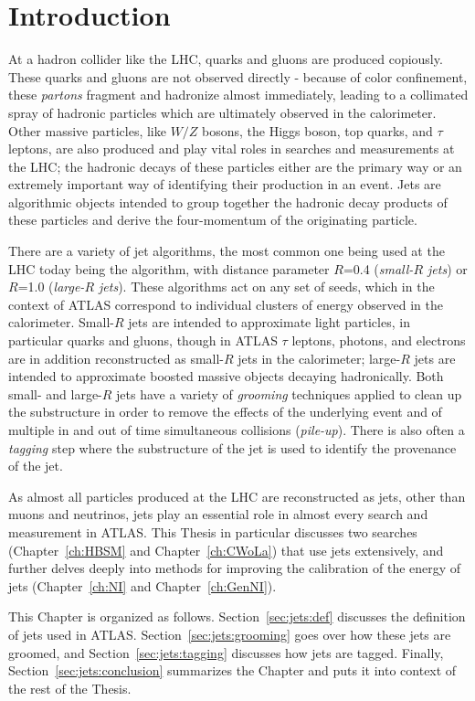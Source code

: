 \section{Introduction}
At a hadron collider like the LHC, quarks and gluons are produced copiously.
These quarks and gluons are not observed directly - because of color confinement, these \textit{partons} fragment and hadronize almost immediately, leading to a collimated spray of hadronic particles which are ultimately observed in the calorimeter.
Other massive particles, like $W/Z$ bosons, the Higgs boson, top quarks, and $\tau$ leptons, are also produced and play vital roles in searches and measurements at the LHC; the hadronic decays of these particles either are the primary way or an extremely important way of identifying their production in an event.
Jets are algorithmic objects intended to group together the hadronic decay products of these particles and derive the four-momentum of the originating particle.

There are a variety of jet algorithms, the most common one being used at the LHC today being the \antikt{} algorithm, with distance parameter $R$=0.4 (\textit{small-$R$ jets}) or $R$=1.0 (\textit{large-$R$ jets}).
These algorithms act on any set of seeds, which in the context of ATLAS correspond to individual clusters of energy observed in the calorimeter.
Small-$R$ jets are intended to approximate light particles, in particular quarks and gluons, though in ATLAS $\tau$ leptons, photons, and electrons are in addition reconstructed as small-$R$ jets in the calorimeter; large-$R$ jets are intended to approximate boosted massive objects decaying hadronically.
Both small- and large-$R$ jets have a variety of \textit{grooming} techniques applied to clean up the substructure in order to remove the effects of the underlying event and of multiple in and out of time simultaneous collisions (\textit{pile-up}).
There is also often a \textit{tagging} step where the substructure of the jet is used to identify the provenance of the jet.

As almost all particles produced at the LHC are reconstructed as jets, other than muons and neutrinos, jets play an essential role in almost every search and measurement in ATLAS.
This Thesis in particular discusses two searches (Chapter~\ref{ch:HBSM} and Chapter~\ref{ch:CWoLa}) that use jets extensively, and further delves deeply into methods for improving the calibration of the energy of jets (Chapter~\ref{ch:NI} and Chapter~\ref{ch:GenNI}).

This Chapter is organized as follows.
Section~\ref{sec:jets:def} discusses the definition of jets used in ATLAS.
Section~\ref{sec:jets:grooming} goes over how these jets are groomed, and Section~\ref{sec:jets:tagging} discusses how jets are tagged.
Finally, Section~\ref{sec:jets:conclusion} summarizes the Chapter and puts it into context of the rest of the Thesis.

